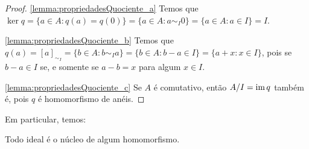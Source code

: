 \begin{proof}
    \ref{lemma:propriedadesQuociente_a} Temos que $\ker q=\{a \in A: q(a)=q(0)\}=\{a \in A: a\sim_I 0\}=\{a \in A: a\in I\}=I$.

    \ref{lemma:propriedadesQuociente_b} Temos que $q(a)=[a]_{\sim_I}=\{b \in A: b\sim_I a\}=\{b \in A: b-a\in I\}=\{a+x: x \in I\}$, pois se $b-a \in I$ se, e somente se $a-b=x$ para algum $x \in I$.

    \ref{lemma:propriedadesQuociente_c} Se $A$ é comutativo, então $A/I=\operatorname{im} q$ também é, pois $q$ é homomorfismo de anéis.
\end{proof}

Em particular, temos:

\begin{corol}
    Todo ideal é o núcleo de algum homomorfismo.
\end{corol}

